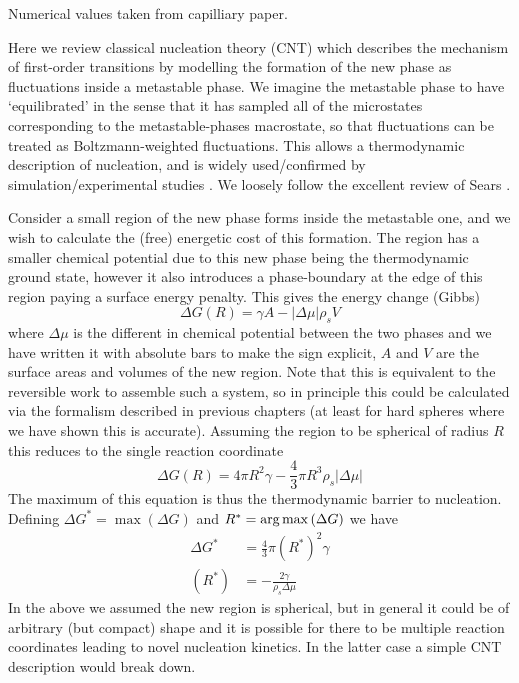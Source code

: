 \documentclass[11pt,twoside]{report}
\begin{document}
Numerical values taken from capilliary paper.

Here we review classical nucleation theory (CNT) which describes the mechanism of first-order transitions by modelling the formation of the new phase as fluctuations inside a metastable phase.
We imagine the metastable phase to have `equilibrated' in the sense that it has sampled all of the microstates corresponding to the metastable-phases macrostate, so that fluctuations can be treated as Boltzmann-weighted fluctuations.
This allows a thermodynamic description of nucleation, and is widely used/confirmed by simulation/experimental studies \cite{?}.
We loosely follow the excellent review of Sears \cite{Sears?}.

Consider a small region of the new phase forms inside the metastable one, and we wish to calculate the (free) energetic cost of this formation.
The region has a smaller chemical potential due to this new phase being the thermodynamic ground state, however it also introduces a phase-boundary at the edge of this region paying a surface energy penalty.
This gives the energy change (Gibbs)
\begin{equation}
  \Delta G(R) = \gamma A - |\Delta \mu| \rho_s V
\end{equation}
where $\Delta \mu$ is the different in chemical potential between the two phases and we have written it with absolute bars to make the sign explicit, $A$ and $V$ are the surface areas and volumes of the new region.
Note that this is equivalent to the reversible work to assemble such a system, so in principle this could be calculated via the formalism described in previous chapters (at least for hard spheres where we have shown this is accurate).
Assuming the region to be spherical of radius $R$ this reduces to the single reaction coordinate
\begin{equation}
  \Delta G(R) = 4\pi R^2 \gamma - \frac{4}{3} \pi R^3 \rho_s |\Delta \mu|
\end{equation}
The maximum of this equation is thus the thermodynamic barrier to nucleation.
Defining $\Delta G^{*} = \max{(\Delta G)}$ and $R^{*} = \operatorname*{arg\,max}{(\Delta G)}$ we have
\begin{align}\label{eq:cnt-barrier}
  \Delta G^{*} &= \frac{4}{3} \pi (R^{*})^2 \gamma \\
  (R^{*}) &= -\frac{2\gamma}{\rho_s \Delta\mu}
\end{align}
In the above we assumed the new region is spherical, but in general it could be of arbitrary (but compact) shape and it is possible for there to be multiple reaction coordinates leading to novel nucleation kinetics.
In the latter case a simple CNT description would break down.
\end{document}
